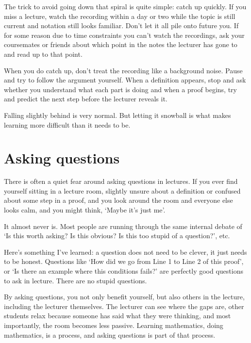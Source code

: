 The trick to avoid going down that spiral is quite simple: catch up quickly. If you miss a lecture, watch the recording within a day or two while the topic is still current and notation still looks familiar. Don't let it all pile onto future you. If for some reason due to time constraints you can't watch the recordings, ask your coursemates or friends about which point in the notes the lecturer has gone to and read up to that point. 

When you do catch up, don't treat the recording like a background noise. Pause and try to follow the argument yourself. When a definition appears, stop and ask whether you understand what each part is doing and when a proof begins, try and predict the next step before the lecturer reveals it. 

Falling slightly behind is very normal. But letting it snowball is what makes learning more difficult than it needs to be. 


\section{Asking questions}

There is often a quiet fear around asking questions in lectures. If you ever find yourself sitting in a lecture room, slightly unsure about a definition or confused about some step in a proof, and you look around the room and everyone else looks calm, and you might think, `Maybe it's just me'. 

It almost never is. Most people are running through the same internal debate of `Is this worth asking? Is this obvious? Is this too stupid of a question?', etc. 

Here's something I've learned: a question does not need to be clever, it just needs to be honest. Questions like `How did we go from Line 1 to Line 2 of this proof', or `Is there an example where this conditions fails?' are perfectly good questions to ask in lecture. There are no stupid questions. 

By asking questions, you not only benefit yourself, but also others in the lecture, including the lecturer themselves. The lecturer can see where the gaps are, other students relax because someone has said what they were thinking, and most importantly, the room becomes less passive. Learning mathematics, doing mathematics, is a process, and asking questions is part of that process. 

